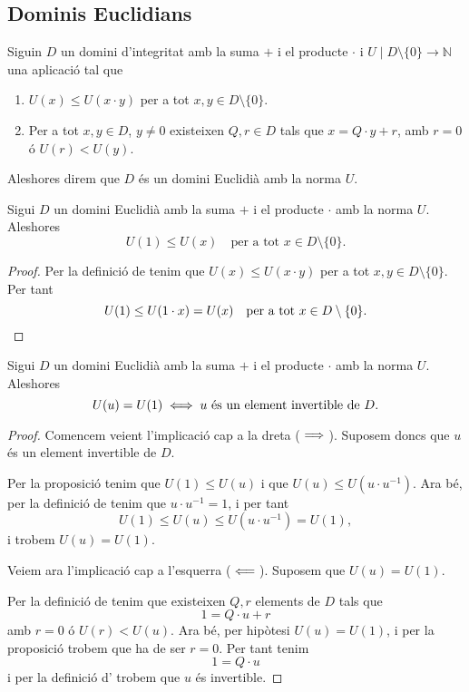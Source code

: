 \documentclass[../Apunts.tex]{subfiles}
\begin{document}
	\subsection{Dominis Euclidians}
	\begin{definition}
		\label{def:domini Euclidià}
		\label{def:DE}
		Siguin \(D\) un domini d'integritat amb la suma \(+\) i el producte \(\cdot\) i \(U\mid D\setminus\{0\}\longrightarrow\mathbb{N}\) una aplicació tal que
		\begin{enumerate}
			\item \(U(x)\leq U(x\cdot y)\) per a tot \(x,y\in D\setminus\{0\}\).
			\item Per a tot \(x,y\in D\), \(y\neq0\) existeixen \(Q,r\in D\) tals que \(x=Q\cdot y+r\), amb \(r=0\) ó \(U(r)<U(y)\).
		\end{enumerate}
		Aleshores direm que \(D\) és un domini Euclidià amb la norma \(U\).
	\end{definition}
	\begin{proposition}
		\label{prop:norma de 1 és la més petita en DE}
		Sigui \(D\) un domini Euclidià amb la suma \(+\) i el producte \(\cdot\) amb la norma \(U\). Aleshores
		\[U(1)\leq U(x)\quad\text{per a tot }x\in D\setminus\{0\}.\]
		\begin{proof}
			Per la definició de  tenim que \(U(x)\leq U(x\cdot y)\) per a tot \(x,y\in D\setminus\{0\}\). Per tant
			\[U(1)\leq U(1\cdot x)=U(x)\quad\text{per a tot }x\in D\setminus\{0\}.\qedhere\]
		\end{proof}
	\end{proposition}
	\begin{proposition}
		Sigui \(D\) un domini Euclidià amb la suma \(+\) i el producte \(\cdot\) amb la norma \(U\). Aleshores
		\[U(u)=U(1)\iff u\text{ és un element invertible de }D.\]
		\begin{proof}			
			Comencem veient l'implicació cap a la dreta (\(\implies\)). Suposem doncs que \(u\) és un element invertible de \(D\).
			
			Per la proposició  tenim que \(U(1)\leq U(u)\) i que \(U(u)\leq U(u\cdot u^{-1})\). Ara bé, per la definició de  tenim que \(u\cdot u^{-1}=1\), i per tant
			\[U(1)\leq U(u)\leq U(u\cdot u^{-1})=U(1),\]
			i trobem \(U(u)=U(1)\).
			
			Veiem ara l'implicació cap a l'esquerra (\(\impliedby\)). Suposem que \(U(u)=U(1)\).
			
			Per la definició de  tenim que existeixen \(Q,r\) elements de \(D\) tals que
			\[1=Q\cdot u+r\]
			amb \(r=0\) ó \(U(r)<U(u)\). Ara bé, per hipòtesi \(U(u)=U(1)\), i per la proposició  trobem que ha de ser \(r=0\). Per tant tenim
			\[1=Q\cdot u\]
			i per la definició d' trobem que \(u\) és invertible.
		\end{proof}
	\end{proposition}
\end{document}

